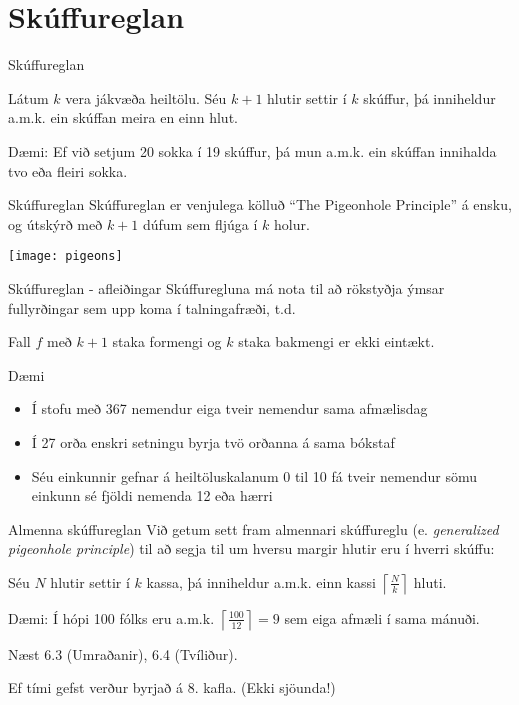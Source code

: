 \documentclass{beamer}
\begin{document}
\section{Skúffureglan}

\begin{frame}{Skúffureglan}
\begin{tcolorbox}[title=Skúffuregla Dirichlets]
Látum $k$ vera jákvæða heiltölu. Séu $k + 1$ hlutir settir í $k$ skúffur, þá inniheldur a.m.k. ein skúffan meira en einn hlut.
\end{tcolorbox}

Dæmi: Ef við setjum 20 sokka í 19 skúffur, þá mun a.m.k. ein skúffan innihalda tvo eða fleiri sokka.
\end{frame}

\begin{frame}{Skúffureglan}
Skúffureglan er venjulega kölluð ``The Pigeonhole Principle'' á ensku, og útskýrð með $k+1$ dúfum sem fljúga í $k$ holur.
\begin{center}
\texttt{[image: pigeons]}
\end{center}
\end{frame}

\begin{frame}{Skúffureglan - afleiðingar}
Skúffuregluna má nota til að rökstyðja ýmsar fullyrðingar sem upp koma í talningafræði, t.d.
\begin{tcolorbox}
Fall $f$ með $k+1$ staka formengi og $k$ staka bakmengi er ekki eintækt.
\end{tcolorbox}
\end{frame}

\begin{frame}{Dæmi}
\begin{itemize}
 \item Í stofu með 367 nemendur eiga tveir nemendur sama afmælisdag
 \item Í 27 orða enskri setningu byrja tvö orðanna á sama bókstaf
 \item Séu einkunnir gefnar á heiltöluskalanum 0 til 10 fá tveir nemendur sömu einkunn sé fjöldi nemenda 12 eða hærri
\end{itemize}
\end{frame}

\begin{frame}{Almenna skúffureglan}
Við getum sett fram almennari skúffureglu (e. \emph{generalized pigeonhole principle}) til að segja til um hversu margir hlutir eru í hverri skúffu:
\begin{tcolorbox}[title=Almenna skúffureglan]
Séu $N$ hlutir settir í $k$ kassa, þá inniheldur a.m.k. einn kassi $\left\lceil \frac{N}{k}\right\rceil$ hluti.
\end{tcolorbox}
Dæmi: Í hópi 100 fólks eru a.m.k. $\left\lceil \frac{100}{12}\right\rceil = 9$ sem eiga afmæli í sama mánuði.

\end{frame}

\begin{frame}{Næst}
6.3 (Umraðanir), 6.4 (Tvíliður).

Ef tími gefst verður byrjað á 8. kafla. (Ekki sjöunda!)
\end{frame}
\end{document}
